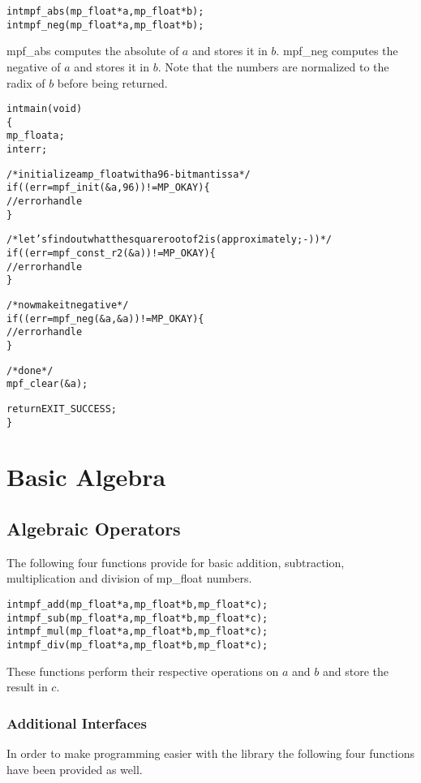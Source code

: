 \documentclass[b5paper]{book}
\begin{document}
 
\begin{alltt}
int  mpf_abs(mp_float *a, mp_float *b);
int  mpf_neg(mp_float *a, mp_float *b);
\end{alltt}

mpf\_abs computes the absolute of $a$ and stores it in $b$.  mpf\_neg computes the negative of $a$ and stores it in $b$.  Note that the numbers
are normalized to the radix of $b$ before being returned.  

\begin{alltt}
int main(void)
\{
   mp_float a;
   int err;

   /* initialize a mp_float with a 96-bit mantissa */
   if ((err = mpf_init(&a, 96)) != MP_OKAY) \{
      // error handle
   \}

   /* let's find out what the square root of 2 is (approximately ;-)) */
   if ((err = mpf_const_r2(&a)) != MP_OKAY) \{
      // error handle 
   \}

   /* now make it negative */
   if ((err = mpf_neg(&a, &a)) != MP_OKAY) \{
      // error handle 
   \}
   
   /* done */
   mpf_clear(&a);

   return EXIT_SUCCESS;
\}
\end{alltt}

\chapter{Basic Algebra}
\section{Algebraic Operators}

The following four functions provide for basic addition, subtraction, multiplication and division of mp\_float numbers.

    
\begin{alltt}
int  mpf_add(mp_float *a, mp_float *b, mp_float *c);
int  mpf_sub(mp_float *a, mp_float *b, mp_float *c);
int  mpf_mul(mp_float *a, mp_float *b, mp_float *c);
int  mpf_div(mp_float *a, mp_float *b, mp_float *c);
\end{alltt}
These functions perform their respective operations on $a$ and $b$ and store the result in $c$.  

\subsection{Additional Interfaces}
In order to make programming easier with the library the following four functions have been provided as well.
\end{document}
